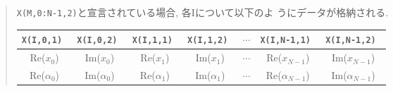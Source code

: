 \documentclass[a4j]{jarticle}
\newcommand{\R}{\mbox{Re}}
\newcommand{\I}{\mbox{Im}}
\begin{document}
\begin{enumerate}
  \begin{quote}

  {\tt X(M,0:N-1,2)}と宣言されている場合, 各Iについて以下のよ
   うにデータが格納される.

    \begin{tabular}{|c|c|c|c|c|c|c|}\hline
     \tt X(I,0,1) & \tt X(I,0,2) & \tt X(I,1,1) & \tt X(I,1,2) & 
     $\cdots$ & \tt X(I,N-1,1) & \tt X(I,N-1,2) \\\hline\hline
      \R($x_0$) & \I($x_0$) & \R($x_1$) & \I($x_1$) &
     $\cdots$ & \R($x_{N-1}$) & \I($x_{N-1}$) \\\hline
      \R($\alpha_0$) & \I($\alpha_0$) & \R($\alpha_1$) & \I($\alpha_1$) &
     $\cdots$ & \R($\alpha_{N-1}$) & \I($\alpha_{N-1}$) \\\hline
    \end{tabular}
  \end{quote}

\end{enumerate}

\newpage  
\end{document}
